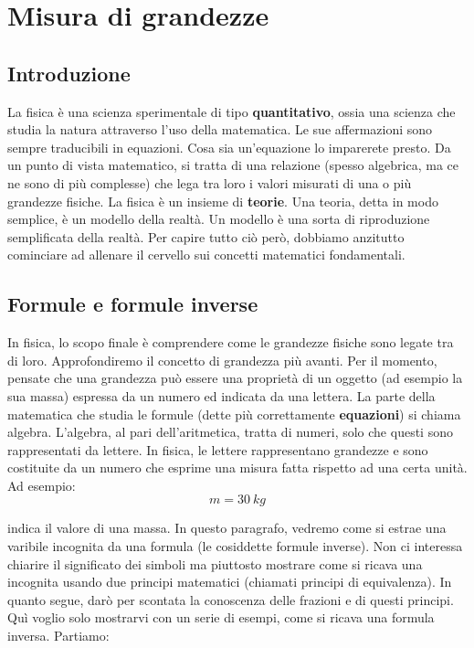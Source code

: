 \chapter{Misura di grandezze}
\section{Introduzione}
La fisica è una scienza sperimentale di tipo \textbf{quantitativo}, ossia una scienza che studia la natura attraverso l'uso della matematica. Le sue affermazioni sono sempre traducibili in equazioni. Cosa sia un'equazione lo imparerete presto. Da un punto di vista matematico, si tratta di una relazione (spesso algebrica, ma ce ne sono di più complesse) che lega tra loro i valori misurati di una o più grandezze fisiche. La fisica è un insieme di \textbf{teorie}. Una teoria, detta in modo semplice, è un modello della realtà. Un modello è una sorta di riproduzione semplificata della realtà. Per capire tutto ciò però, dobbiamo anzitutto cominciare ad allenare il cervello sui concetti matematici fondamentali.
\section{Formule e formule inverse}

In fisica, lo scopo finale è comprendere come le grandezze fisiche  sono legate tra di loro. Approfondiremo il concetto di grandezza più avanti. Per il momento, pensate che una grandezza può essere una proprietà di un oggetto (ad esempio la sua massa) espressa da un numero ed indicata da una lettera. La parte della matematica che studia le formule (dette più correttamente \textbf{equazioni}) si chiama algebra. L'algebra, al pari dell'aritmetica, tratta di numeri, solo che questi sono rappresentati da lettere. In fisica, le lettere rappresentano grandezze e sono costituite da un numero che esprime una misura fatta rispetto ad una certa unità. Ad esempio:
\[
m=\SI{30}{kg}
\]

indica il valore di una massa. In questo paragrafo, vedremo come si estrae una varibile incognita da una formula (le cosiddette formule inverse). Non ci interessa chiarire il significato dei simboli ma piuttosto mostrare come si ricava una incognita usando due principi matematici (chiamati principi di equivalenza). In quanto segue, darò per scontata la conoscenza delle frazioni e di questi principi. Quì voglio solo mostrarvi con un serie di esempi, come si ricava una formula inversa. Partiamo:

	
	
